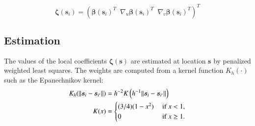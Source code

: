 \documentclass[authoryear, review, 11pt]{elsarticle}
\begin{document}
    \begin{equation*}
        \bm{\zeta}(\bm{s}_i) = \left( \bm{\beta}(\bm{s}_i)^T \;\; \nabla_u \bm{\beta}(\bm{s}_i)^T \;\; \nabla_v \bm{\beta}(\bm{s}_i)^T \right)^T
    \end{equation*}
  
    \subsection{Estimation}		
	
  

  
    The values of the local coefficients $\bm{\zeta}(\bm{s})$ are estimated at location $\bm{s}$ by penalized weighted least squares. The weights are computed from a kernel function $K_h(\cdot)$ such as the Epanechnikov kernel:
    \begin{align}\label{eq:epanechnikov}
        K_h(\| \bm{s}_i - \bm{s}_{i'}\|) &= h^{-2} K\left( h^{-1} \| \bm{s}_i - \bm{s}_{i'}\| \right) \notag \\
        K(x) &= \begin{cases} (3/4) (1-x^2) &\mbox{ if } x < 1, \\ 0 &\mbox{ if } x \geq 1. \end{cases}
	\end{align}
  
\end{document}
